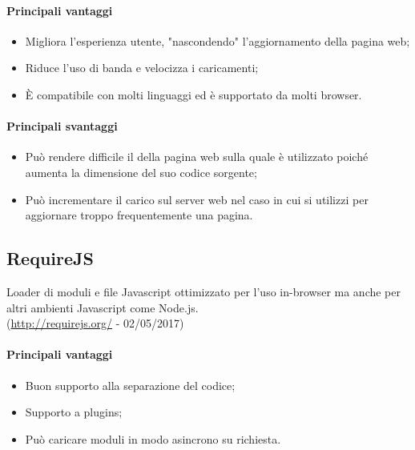 \documentclass[../PianoDiQualifica.tex]{subfiles}
\begin{document}
			\paragraph{Principali vantaggi}
			\begin{itemize}
					\item Migliora l'esperienza utente, "nascondendo" l'aggiornamento della
					pagina web;
					\item Riduce l'uso di banda e velocizza i caricamenti;
					\item È compatibile con molti linguaggi ed è supportato da molti browser.
				\end{itemize}
			\paragraph{Principali svantaggi}
				\begin{itemize}
					\item Può rendere difficile il  della pagina web sulla quale è utilizzato
					poiché aumenta la dimensione del suo codice sorgente;
					\item Può incrementare il carico sul server web nel caso in cui si utilizzi per
					aggiornare troppo frequentemente una pagina.
				\end{itemize}
		\subsection{RequireJS}
			Loader di moduli e file Javascript ottimizzato per l'uso in-browser ma anche per altri
			ambienti Javascript come Node.js.\\
			(\url{http://requirejs.org/} - 02/05/2017)
			\paragraph{Principali vantaggi}
			\begin{itemize}
					\item Buon supporto alla separazione del codice;
					\item Supporto a plugins;
					\item Può caricare moduli in modo asincrono su richiesta.
				\end{itemize}
\end{document}
